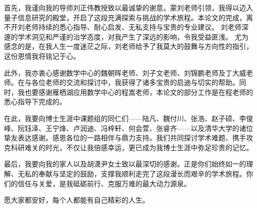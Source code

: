 
\begin{acknowledgements}
  首先，我谨向我的导师刘正伟教授致以最诚挚的谢意。蒙刘老师引领，我得以迈入量子信息研究的殿堂，开启了这段充满探索与挑战的学术旅程。本论文的完成，离不开刘老师持续的悉心指导、耐心启发、无私支持与宝贵的专业建议。
  刘老师深邃的学术洞见和严谨的治学态度，对我产生了深远的影响，令我受益匪浅。
  尤为感念的是，在我人生一度迷茫之际，刘老师给予了我莫大的鼓舞与方向性的指引，这份恩情我将铭记于心。

此外，我亦衷心感谢数学中心的魏朝晖老师、刘子文老师、刘锦鹏老师及丁大威老师。在与各位老师的交流和探讨中，我获得了诸多宝贵的启迪与切实的帮助。同时，我也要感谢雁栖湖应用数学中心的程嵩老师，本论文的部分工作是在程老师的悉心指导下完成的。

在此，我要向博士生涯中课题组的同仁们——陆凡、魏付川、张浩、赵子硕、李俊峰、阮钰泽、王宁烽、卢润迪、冯梓轩、何会萱、张睿齐——以及清华大学的诸位挚友表达感谢。感恩各位的一路相伴与鼎力支持。我们共同探讨学术难题、携手攻克科研难关的时光，不仅让我倍感幸运，更已成为我博士生涯中弥足珍贵的记忆。

最后，我要向我的家人以及胡潇尹女士致以最深切的感谢。正是你们始终如一的理解、无私的奉献与坚定的鼓励，支撑我顺利走完了这段漫长而艰辛的学术旅程。你们的信任与关爱，是我砥砺前行、克服万难的最大动力源泉。

愿大家都安好，每个人都能有自己精彩的人生。
\end{acknowledgements}
